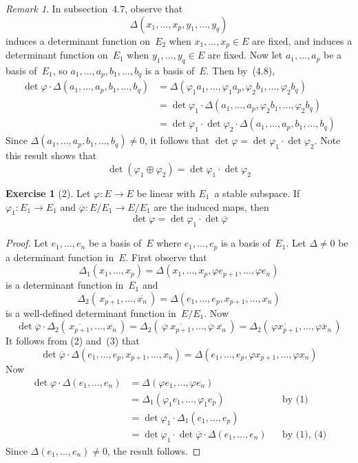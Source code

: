 \documentclass[letterpaper,12pt]{article}
\newcommand{\dsum}{\oplus}
\newcommand{\mult}{\cdot}
\theoremstyle{definition}
\newtheorem*{exer}{Exercise}
\theoremstyle{remark}
\newtheorem*{rmk}{Remark}
\begin{document}
\begin{rmk}
In subsection~4.7, observe that
\[\Delta(x_1,\ldots,x_p,y_1,\ldots,y_q)\]
induces a determinant function on~\(E_2\) when \(x_1,\ldots,x_p\in E\) are fixed, and induces a determinant function on~\(E_1\) when \(y_1,\ldots,y_q\in E\) are fixed. Now let \(a_1,\ldots,a_p\) be a basis of~\(E_1\), so \(a_1,\ldots,a_p,b_1,\ldots,b_q\) is a basis of~\(E\). Then by~(4.8),
\begin{align*}
\det\varphi\mult\Delta(a_1,\ldots,a_p,b_1,\ldots,b_q)&=\Delta(\varphi_1 a_1,\ldots,\varphi_1 a_p,\varphi_2 b_1,\ldots,\varphi_2 b_q)\\
	&=\det\varphi_1\mult\Delta(a_1,\ldots,a_p,\varphi_2 b_1,\ldots,\varphi_2 b_q)\\
	&=\det\varphi_1\mult\det\varphi_2\mult\Delta(a_1,\ldots,a_p,b_1,\ldots,b_q)
\end{align*}
Since \(\Delta(a_1,\ldots,a_p,b_1,\ldots,b_q)\ne0\), it follows that \(\det\varphi=\det\varphi_1\mult\det\varphi_2\). Note this result shows that
\[\det(\varphi_1\dsum\varphi_2)=\det\varphi_1\mult\det\varphi_2\]
\end{rmk}

\begin{exer}[2]
Let \(\varphi:E\to E\) be linear with \(E_1\)~a stable subspace. If \(\varphi_1:E_1\to E_1\) and \(\overline{\varphi}:E/E_1\to E/E_1\) are the induced maps, then
\[\det\varphi=\det\varphi_1\mult\det\overline{\varphi}\]
\end{exer}
\begin{proof}
Let \(e_1,\ldots,e_n\) be a basis of~\(E\) where \(e_1,\ldots,e_p\) is a basis of~\(E_1\). Let \(\Delta\ne 0\) be a determinant function in~\(E\). First observe that
\[\Delta_1(x_1,\ldots,x_p)=\Delta(x_1,\ldots,x_p,\varphi e_{p+1},\ldots,\varphi e_n)\tag{1}\]
is a determinant function in~\(E_1\) and
\[\Delta_2(\,\overline{x_{p+1}},\ldots,\overline{x_n}\,)=\Delta(e_1,\ldots,e_p,x_{p+1},\ldots,x_n)\tag{2}\]
is a well-defined determinant function in~\(E/E_1\). Now
\[\det\overline{\varphi}\mult\Delta_2(\,\overline{x_{p+1}},\ldots,\overline{x_n}\,)=\Delta_2(\,\overline{\varphi}\ \overline{x_{p+1}},\ldots,\overline{\varphi}\ \overline{x_n}\,)=\Delta_2(\,\overline{\varphi x_{p+1}},\ldots,\overline{\varphi x_n}\,)\tag{3}\]
It follows from (2) and~(3) that
\[\det\overline{\varphi}\mult\Delta(e_1,\ldots,e_p,x_{p+1},\ldots,x_n)=\Delta(e_1,\ldots,e_p,\varphi x_{p+1},\ldots,\varphi x_n)\tag{4}\]
Now
\begin{align*}
\det\varphi\mult\Delta(e_1,\ldots,e_n)&=\Delta(\varphi e_1,\ldots,\varphi e_n)&&\\
	&=\Delta_1(\varphi_1 e_1,\ldots,\varphi_1 e_p)&&\text{by~(1)}\\
	&=\det\varphi_1\mult\Delta_1(e_1,\ldots,e_p)&&\\
	&=\det\varphi_1\mult\det\overline{\varphi}\mult\Delta(e_1,\ldots,e_n)&&\text{by (1), (4)}
\end{align*}
Since \(\Delta(e_1,\ldots,e_n)\ne 0\), the result follows.
\end{proof}
\end{document}
